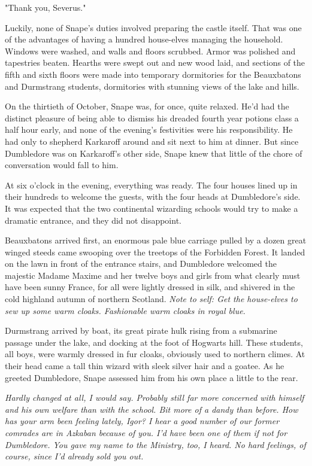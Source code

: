 "Thank you, Severus."

Luckily, none of Snape's duties involved preparing the castle itself. That was one of the advantages of having a hundred house-elves managing the household. Windows were washed, and walls and floors scrubbed. Armor was polished and tapestries beaten. Hearths were swept out and new wood laid, and sections of the fifth and sixth floors were made into temporary dormitories for the Beauxbatons and Durmstrang students, dormitories with stunning views of the lake and hills.

On the thirtieth of October, Snape was, for once, quite relaxed. He'd had the distinct pleasure of being able to dismiss his dreaded fourth year potions class a half hour early, and none of the evening's festivities were his responsibility. He had only to shepherd Karkaroff around and sit next to him at dinner. But since Dumbledore was on Karkaroff's other side, Snape knew that little of the chore of conversation would fall to him.

At six o'clock in the evening, everything was ready. The four houses lined up in their hundreds to welcome the guests, with the four heads at Dumbledore's side. It was expected that the two continental wizarding schools would try to make a dramatic entrance, and they did not disappoint.

Beauxbatons arrived first, an enormous pale blue carriage pulled by a dozen great winged steeds came swooping over the treetops of the Forbidden Forest. It landed on the lawn in front of the entrance stairs, and Dumbledore welcomed the majestic Madame Maxime and her twelve boys and girls from what clearly must have been sunny France, for all were lightly dressed in silk, and shivered in the cold highland autumn of northern Scotland. \emph{Note to self: Get the house-elves to sew up some warm cloaks. Fashionable warm cloaks in{\el} royal blue.}

Durmstrang arrived by boat, its great pirate hulk rising from a submarine passage under the lake, and docking at the foot of Hogwarts hill. These students, all boys, were warmly dressed in fur cloaks, obviously used to northern climes. At their head came a tall thin wizard with sleek silver hair and a goatee. As he greeted Dumbledore, Snape assessed him from his own place a little to the rear.

\emph{Hardly changed at all, I would say. Probably still far more concerned with himself and his own welfare than with the school. Bit more of a dandy than before. How has your arm been feeling lately, Igor? I hear a good number of our former comrades are in Azkaban because of you. I'd have been one of them if not for Dumbledore. You gave my name to the Ministry, too, I heard. No hard feelings, of course, since I'd already sold you out.}

